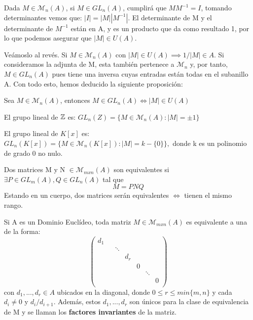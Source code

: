 Dada $M \in \mathcal{M}_n(A)$, si $M \in GL_n(A)$, cumplirá que $MM^{-1} = I$, tomando determinantes vemos que: $|I|=|M||M^{-1}|$. El determinante de M y el determinante de $M^{-1}$ están en A, y es un producto que da como resultado 1, por lo que podemos asegurar que $|M| \in U(A)$.

Veámoslo al revés. Si $M\in \mathcal{M}_n(A)$ con $|M| \in U(A) \implies 1/|M| \in A$. Si consideramos la adjunta de M, esta también pertenece a $\mathcal{M}_n$ y, por tanto, $M \in GL_n(A)$ pues tiene una inversa cuyas entradas están todas en el subanillo A.
Con todo esto, hemos deducido la siguiente proposición:

\begin{nprop}
	Sea $M \in \mathcal{M}_n(A)$, entonces $M \in GL_n(A) \iff |M| \in U(A)$
\end{nprop}

\begin{ejemplo}
	El grupo lineal de $\mathbb{Z}$ es: $GL_n(Z) = \{M \in \mathcal{M}_n(A) :  |M| = \pm 1\}$
\end{ejemplo}

\begin{ejemplo}[2]
	El grupo lineal de $K[x]$ es: $GL_n(K[x]) = \{M \in \mathcal{M}_n(K[x]) :  |M| = k - \{0\} \},$ donde k es un polinomio de grado 0 no nulo.
\end{ejemplo}

\begin{ndef}
	Dos matrices M y N $\in \mathcal{M}_{mxn}(A)$ son equivalentes si $\exists P\in GL_m(A), Q \in GL_n(A)$ tal que
	\[
	M = PNQ
	\]
Estando en un cuerpo, dos matrices serán equivalentes $\iff$ tienen el mismo rango.
\end{ndef}

\begin{nth}
	Si A es un Dominio Euclídeo, toda matriz  $M \in \mathcal{M}_{mxn}(A)$ es equivalente a una de la forma:
		\[ \begin{pmatrix}
			 d_{1}&  &  & & \\
			 &  & \ddots &  &  \\
			 & & &d_{r} &\\
			 & & & & 0 \\
			 & & & & & \ddots& \\
			 & & & &  & & 0 \\
		\end{pmatrix} \]
con $d_{1},...,d_{r} \in A$ ubicados en la diagonal, donde $ 0 \leq r \leq min\{m,n\} $ y cada $d_{i}\ne 0$ y $d_{i}/ d_{i+1}$.  Además, estos $d_{1}, ...,d_{r}$ son únicos para la clase de equivalencia de M y se llaman los \textbf{factores invariantes} de la matriz.
\end{nth}

